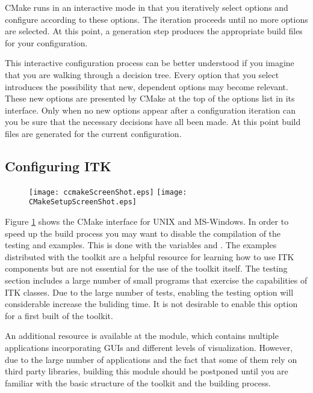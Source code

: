 CMake runs in an interactive mode in that you iteratively select options and
configure according to these options. The iteration proceeds until no more
options are selected. At this point, a generation step produces the appropriate
build files for your configuration.

This interactive configuration process can be better understood if you
imagine that you are walking through a decision tree.  Every option that you
select introduces the possibility that new, dependent options may become
relevant. These new options are presented by CMake at the top of the options
list in its interface.  Only when no new options appear after a configuration
iteration can you be sure that the necessary decisions have all been made. At
this point build files are generated for the current configuration.

\subsection{Configuring ITK}
\label{sec:ConfiguringITKwithVTK}
  

\begin{figure}[ht]
\centering 
\texttt{[image: ccmakeScreenShot.eps]}
\texttt{[image: CMakeSetupScreenShot.eps]}
\label{fig:CMakeGUI}
\end{figure}

Figure \ref{fig:CMakeGUI} shows the CMake interface for UNIX and MS-Windows.
In order to speed up the build process you may want to disable the compilation
of the testing and examples. This is done with the variables
 and .  The examples
distributed with the toolkit are a helpful resource for learning how to use ITK
components but are not essential for the use of the toolkit itself. The testing
section includes a large number of small programs that exercise the
capabilities of ITK classes. Due to the large number of tests, enabling the
testing option will considerable increase the buliding time.  It is not
desirable to enable this option for a first built of the toolkit.

An additional resource is available at the  module,
which contains multiple applications incorporating GUIs and different levels
of visualization.  However, due to the large number of applications and the
fact that some of them rely on third party libraries, building this module
should be postponed until you are familiar with the basic structure of the
toolkit and the building process. 

